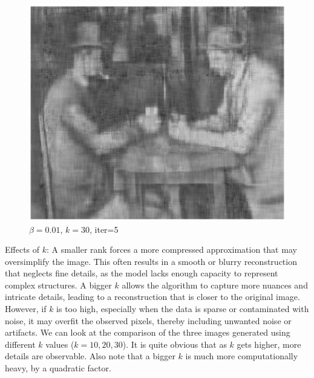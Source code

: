 \documentclass[11pt,onecolumn]{article}
\begin{document}
\begin{figure}[H]
  \begin{minipage}{0.3\textwidth}
    \centering
    \includegraphics[width=1\textwidth]{./images/203.png}
    \caption{$\beta=0.01$, $k=30$, iter=5}
  \end{minipage}
\end{figure}

Effects of $k$:
A smaller rank forces a more compressed approximation that may oversimplify the image. This often results in a smooth or blurry reconstruction that neglects fine details, as the model lacks enough capacity to represent complex structures. A bigger $k$ allows the algorithm to capture more nuances and intricate details, leading to a reconstruction that is closer to the original image. However, if $k$ is too high, especially when the data is sparse or contaminated with noise, it may overfit the observed pixels, thereby including unwanted noise or artifacts. We can look at the comparison of the three images generated using different $k$ values ($k=10,20, 30$). It is quite obvious that as $k$ gets higher, more details are observable. Also note that a bigger $k$ is much more computationally heavy, by a quadratic factor.
\end{document}
